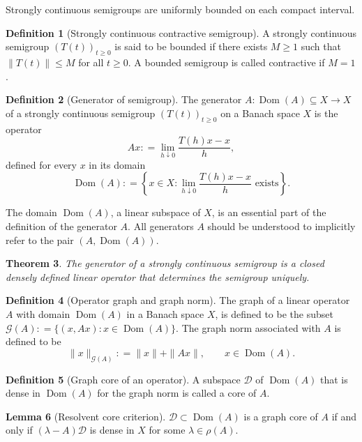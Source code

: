 \documentclass[11pt,a4paper]{article}
\theoremstyle{plain}
\newtheorem{theorem}{Theorem}
\numberwithin{theorem}{section}
\theoremstyle{definition}
\newtheorem{definition}[theorem]{Definition}
\newtheorem{lemma}[theorem]{Lemma}
\newcommand{\?}{\overset{?}{=}}
\newcommand{\defeq}{\mathrel{\mathop:}=}
\newcommand{\lbr}{\left \{}
\newcommand{\rbr}{\right \}}
\renewcommand{\l}{\lambda}	%
\renewcommand{\r}{\rho}		%
\newcommand{\cD}{\mathcal{D}}
\newcommand{\cG}{\mathcal{G}}
\DeclareMathOperator{\Dom}{Dom}
\begin{document}
\begin{appendix}
Strongly continuous semigroups are uniformly bounded on each compact interval.
\begin{definition}[Strongly continuous contractive semigroup]
A strongly continuous semigroup $(T(t))_{t\geq0}$ is said to be bounded if there exists $M\geq 1$ such that $\|T(t)\|\leq M$ for all $t\geq 0$. A bounded semigroup is called contractive if $M=1$.
\end{definition}
\begin{definition}[Generator of semigroup]\label{def:generator}
The generator $A:\Dom(A)\subseteq X\to X$ of a strongly continuous semigroup $(T(t))_{t\geq0}$ on a Banach space $X$ is the operator
\begin{equation}\label{eq:defn-semigp-gen}
    Ax \defeq \lim_{h\downarrow0}\frac{T(h)x-x}{h},
\end{equation}
defined for every $x$ in its domain
\begin{equation}\label{eq:defn-semigp-gen-dom}
    \Dom(A)\defeq \lbr x\in X:\lim_{h\downarrow0}\frac{T(h)x-x}{h} \text{ exists} \rbr.
\end{equation}
\end{definition}
The domain $\Dom(A)$, a linear subspace of $X$, is an essential part of the definition of the generator $A$. All generators $A$ should be understood to implicitly refer to the pair $(A,\Dom(A))$.
\begin{theorem}\label{thm:generator-is-closed}
The generator of a strongly continuous semigroup is a closed densely defined linear operator that determines the semigroup uniquely.
\end{theorem}
\begin{definition}[Operator graph and graph norm]\label{def:graph}
The graph of a linear operator $A$ with domain $\Dom(A)$ in a Banach space $X$, is defined to be the subset $\cG(A)\defeq\{(x,Ax):x\in \Dom(A)\}$. The graph norm associated with $A$ is defined to be
\begin{equation}\label{eq:graph-norm}
    \|x\|_{\cG(A)}\defeq \|x\|+\|Ax\|, \qquad x\in \Dom(A).
\end{equation}
\end{definition}\label{def:core}
\begin{definition}[Graph core of an operator]
A subspace $\cD$ of $\Dom(A)$ that is dense in $\Dom(A)$ for the graph norm is called a core of $A$.
\end{definition}

\begin{lemma}[Resolvent core criterion]\label{lem:resolvent-core}
    $\cD \subset\Dom(A)$ is a graph core of $A$ if and only if $(\l-A)\cD$ is dense in $X$ for some $\l\in\r(A)$.
\end{lemma}



\end{appendix}
\end{document}
